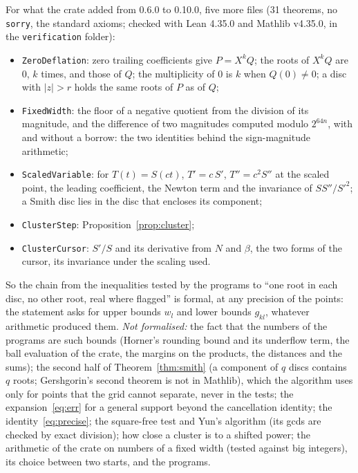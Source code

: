 \documentclass[10pt,a4paper]{article}
\theoremstyle{definition}
\numberwithin{equation}{section}
\begin{document}
For what the crate added from 0.6.0 to 0.10.0, five more files (31 theorems, no \texttt{sorry}, the
standard axioms; checked with Lean 4.35.0 and Mathlib v4.35.0, in the \texttt{verification} folder):
\begin{itemize}
\item \texttt{ZeroDeflation}: zero trailing coefficients give $P=X^kQ$; the roots of $X^kQ$ are $0$,
 $k$ times, and those of $Q$; the multiplicity of $0$ is $k$ when $Q(0)\ne0$; a disc with $|z|>r$ holds
 the same roots of $P$ as of $Q$;
\item \texttt{FixedWidth}: the floor of a negative quotient from the division of its magnitude, and the
 difference of two magnitudes computed modulo $2^{64n}$, with and without a borrow: the two identities
 behind the sign-magnitude arithmetic;
\item \texttt{ScaledVariable}: for $T(t)=S(ct)$, $T'=c\,S'$, $T''=c^2S''$ at the scaled point, the
 leading coefficient, the Newton term and the invariance of $SS''/S'^2$; a Smith disc lies in the disc
 that encloses its component;
\item \texttt{ClusterStep}: Proposition~\ref{prop:cluster};
\item \texttt{ClusterCursor}: $S'/S$ and its derivative from $N$ and $\beta$, the two forms of the
 cursor, its invariance under the scaling used.
\end{itemize}
So the chain from the inequalities tested by the programs to ``one root in each disc, no other root,
real where flagged'' is formal, at any precision of the points: the statement asks for upper bounds
$w_l$ and lower bounds $g_{kl}$, whatever arithmetic produced them. \emph{Not formalised:} the fact
that the numbers of the programs are such bounds (Horner's rounding bound and its underflow term, the
ball evaluation of the crate, the margins on the products, the distances and the sums); the second half
of Theorem~\ref{thm:smith} (a component of $q$ discs contains $q$ roots; Gershgorin's second theorem is
not in Mathlib), which the algorithm uses only for points that the grid cannot separate, never in the
tests; the expansion~\eqref{eq:err} for a general support beyond the cancellation identity; the
identity~\eqref{eq:precise}; the square-free test and Yun's algorithm (its gcds are checked by exact
division); how close a cluster is to a shifted power; the arithmetic of the crate on numbers of a fixed
width (tested against big integers), its choice between two starts, and the programs.
\end{document}
